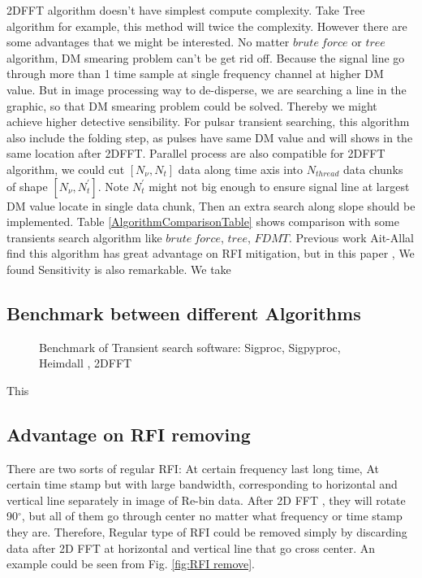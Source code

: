 \documentclass[iop]{emulateapj}
\begin{document}
2DFFT algorithm doesn't have simplest compute complexity.  Take Tree algorithm for example, this method will twice the complexity.  However there are some advantages that we might be interested. No matter $brute~force$ or $tree$ algorithm, DM smearing problem can't be get rid off. Because the signal line go through more than 1 time sample at single frequency channel at higher DM value. But in image processing way to de-disperse, we are searching a line in the graphic, so that DM smearing problem could be solved. Thereby we might achieve higher detective sensibility. For pulsar transient searching, this algorithm also include the folding step, as pulses have same DM value and will shows in the same location after 2DFFT. Parallel process are also compatible for 2DFFT algorithm, we could cut $[N_{\nu},N_t]$ data along time axis into $N_{thread}$ data chunks of shape $[N_{\nu},N_t^{'}]$. Note $N_t^{'}$ might not big enough to ensure signal line at largest DM value locate in single data chunk, Then an extra search along slope should be implemented.  Table \ref{AlgorithmComparisonTable} shows comparison with some transients search algorithm like $brute~force$, $tree$, $FDMT$.  
	Previous work Ait-Allal find this algorithm has great advantage on RFI mitigation, but in this paper , We found Sensitivity is also remarkable. We take 




\subsection{Benchmark between different Algorithms}
\begin{figure}[ht!]
\caption{Benchmark of Transient search software: Sigproc, Sigpyproc, Heimdall , 2DFFT \label{fig:benchmark}}
\end{figure} 
This 

\subsection{Advantage on RFI removing}
There are two sorts of regular RFI: At certain frequency last long time, At certain time stamp but with large bandwidth, corresponding to horizontal and vertical line separately in image of Re-bin data. After 2D FFT , they will rotate 90$^{\circ}$, but all of them go through center no matter what frequency or time stamp they are. Therefore, Regular type of RFI could be removed simply by discarding data after 2D FFT at horizontal and vertical line that go cross center.%
An example could be seen from Fig. \ref{fig:RFI remove}.
\end{document}
